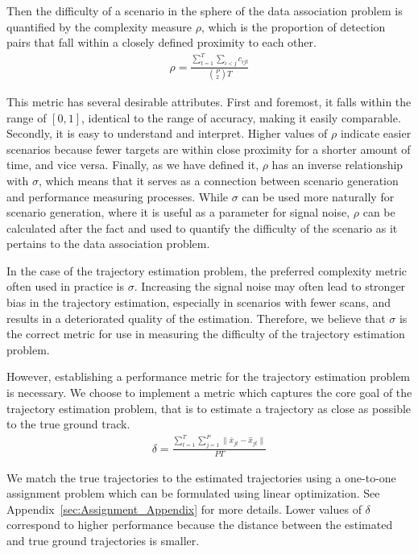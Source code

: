 \documentclass[journal]{IEEEtran}
\begin{document}
Then the difficulty of a scenario in the sphere of the data association problem is quantified by the complexity measure $\rho$, which is the proportion of detection pairs that fall within a closely defined proximity to each other. 
\begin{align}
\rho =  \frac{\sum\limits_{t=1}^{T}\sum\limits_{i<j}c_{ijt}}{\binom{P}{2} T}
\end{align}

This metric has several desirable attributes. First and foremost, it falls within the range of $[0,1]$, identical to the range of accuracy, making it easily comparable. Secondly, it is easy to understand and interpret. Higher values of $\rho$ indicate easier scenarios because fewer targets are within close proximity for a shorter amount of time, and vice versa. Finally, as we have defined it, $\rho$ has an inverse relationship with $\sigma$, which means that it serves as a connection between scenario generation and performance measuring processes. While $\sigma$ can be used more naturally for scenario generation, where it is useful as a parameter for signal noise, $\rho$ can be calculated after the fact and used to quantify the difficulty of the scenario as it pertains to the data association problem. 

In the case of the trajectory estimation problem, the preferred complexity metric often used in practice is $\sigma$. Increasing the signal noise may often lead to stronger bias in the trajectory estimation, especially in scenarios with fewer scans, and results in a deteriorated quality of the estimation. Therefore, we believe that $\sigma$ is the correct metric for use in measuring the difficulty of the trajectory estimation problem. 

However, establishing a performance metric for the trajectory estimation problem is necessary. We choose to implement a metric which captures the core goal of the trajectory estimation problem, that is to estimate a trajectory as close as possible to the true ground track. 
\begin{align}
	\delta = \frac{\sum\limits_{t=1}^{T}\sum\limits_{j=1}^{P}\| \bar{x}_{jt} - \hat{x}_{jt} \|}{PT}
\end{align}

We match the true trajectories to the estimated trajectories using a one-to-one assignment problem which can be formulated using linear optimization. See Appendix~\ref{sec:Assignment_Appendix} for more details. Lower values of $\delta$ correspond to higher performance because the distance between the estimated and true ground trajectories is smaller. 
\end{document}
